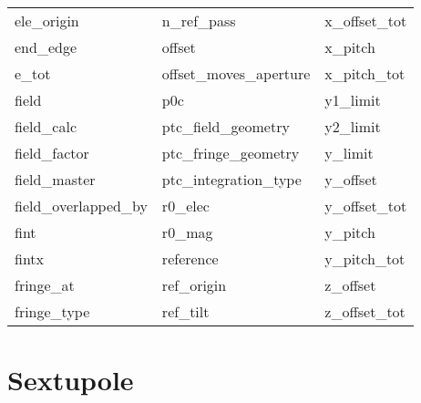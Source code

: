 \begin{tabular}{lll}
ele_origin                  & n_ref_pass                  & x_offset_tot                \\
end_edge                    & offset                      & x_pitch                     \\
e_tot                       & offset_moves_aperture       & x_pitch_tot                 \\
field                       & p0c                         & y1_limit                    \\
field_calc                  & ptc_field_geometry          & y2_limit                    \\
field_factor                & ptc_fringe_geometry         & y_limit                     \\
field_master                & ptc_integration_type        & y_offset                    \\
field_overlapped_by         & r0_elec                     & y_offset_tot                \\
fint                        & r0_mag                      & y_pitch                     \\
fintx                       & reference                   & y_pitch_tot                 \\
fringe_at                   & ref_origin                  & z_offset                    \\
fringe_type                 & ref_tilt                    & z_offset_tot                \\
 \bottomrule
 \end{tabular}
 \vfill
 
 \section{Sextupole}
 \label{s:list.sextupole}
 
